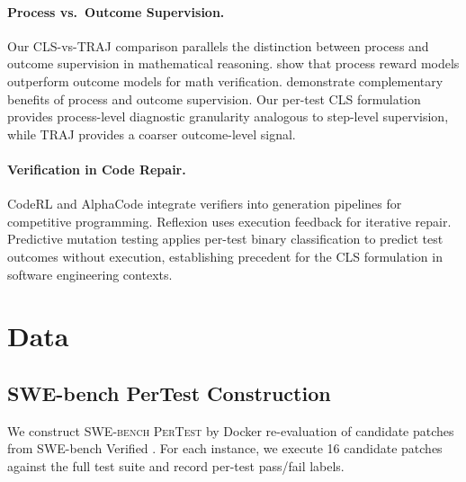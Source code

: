 \documentclass[11pt]{article}
\begin{document}
\paragraph{Process vs.\ Outcome Supervision.}
Our CLS-vs-TRAJ comparison parallels the distinction between process and outcome supervision in mathematical reasoning. \citet{lightman2023lets} show that process reward models outperform outcome models for math verification. \citet{uesato2022solving} demonstrate complementary benefits of process and outcome supervision. Our per-test CLS formulation provides process-level diagnostic granularity analogous to step-level supervision, while TRAJ provides a coarser outcome-level signal.

\paragraph{Verification in Code Repair.}
CodeRL \citep{le2022coderl} and AlphaCode \citep{li2022competition} integrate verifiers into generation pipelines for competitive programming. Reflexion \citep{shinn2023reflexion} uses execution feedback for iterative repair. Predictive mutation testing \citep{zhang2023predictive} applies per-test binary classification to predict test outcomes without execution, establishing precedent for the CLS formulation in software engineering contexts.

\section{Data}
\label{sec:data}

\subsection{SWE-bench PerTest Construction}

We construct \textsc{SWE-bench PerTest} by Docker re-evaluation of candidate patches from SWE-bench Verified \citep{jimenez2024swebench}. For each instance, we execute 16 candidate patches against the full test suite and record per-test pass/fail labels.
\end{document}

